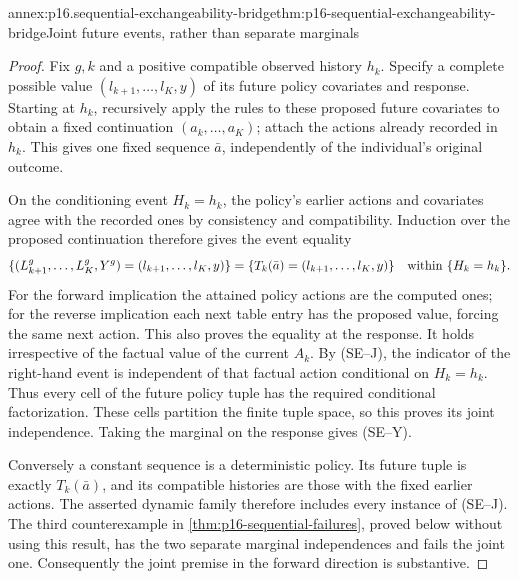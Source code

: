 \begin{annexitem}{annex:p16.sequential-exchangeability-bridge}{thm:p16-sequential-exchangeability-bridge}{Joint future events, rather than separate marginals}
\begin{proof}
Fix \(g,k\) and a positive compatible observed history \(h_k\).
Specify a complete possible value
\((l_{k+1},\ldots,l_K,y)\) of its future policy covariates and response.
Starting at \(h_k\), recursively apply the rules to these proposed future
covariates to obtain a fixed continuation \((a_k,\ldots,a_K)\); attach
the actions already recorded in \(h_k\). This gives one fixed sequence
\(\bar a\), independently of the individual's original outcome.

On the conditioning event \(H_k=h_k\), the policy's earlier actions and
covariates agree with the recorded ones by consistency and compatibility.
Induction over the proposed continuation therefore gives the event equality
\[
 \{(L_{k+1}^g,\ldots,L_K^g,Y^g)=(l_{k+1},\ldots,l_K,y)\}
 =\{T_k(\bar a)=(l_{k+1},\ldots,l_K,y)\}
 \quad\hbox{within }\{H_k=h_k\}.
\]
For the forward implication the attained policy actions are the computed
ones; for the reverse implication each next table entry has the proposed
value, forcing the same next action. This also proves the equality at the
response. It holds irrespective of the factual value of the current
\(A_k\). By (SE--J), the indicator of the right-hand event is independent
of that factual action conditional on \(H_k=h_k\). Thus every cell of the
future policy tuple has the required conditional factorization. These cells
partition the finite tuple space, so this proves its joint independence.
Taking the marginal on the response gives (SE--Y).

Conversely a constant sequence is a deterministic policy. Its future tuple
is exactly \(T_k(\bar a)\), and its compatible histories are those with
the fixed earlier actions. The asserted dynamic family therefore includes
every instance of (SE--J). The third counterexample in
\cref{thm:p16-sequential-failures}, proved below without using this result,
has the two separate marginal independences and fails the joint one.
Consequently the joint premise in the forward direction is substantive.
\end{proof}
\end{annexitem}

